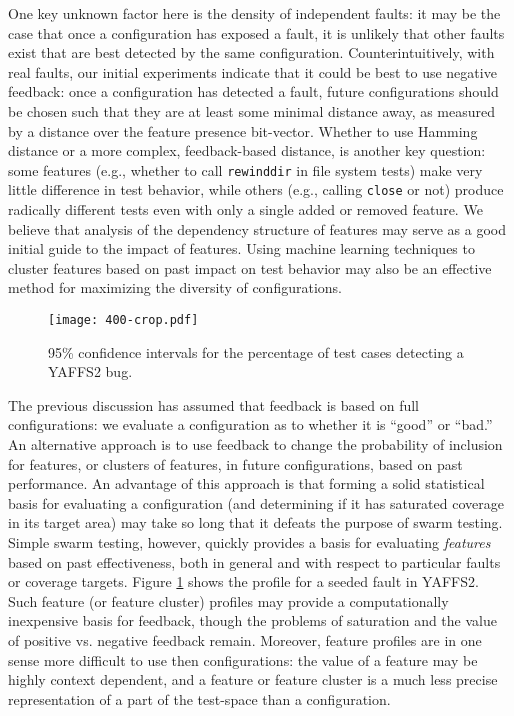 One key unknown factor here is the density of independent faults: it
may be the case that once a configuration has exposed a fault, it is
unlikely that other faults exist that are best detected by the same
configuration.  Counterintuitively, with real faults, our initial
experiments indicate that it could be best to use negative feedback:
once a configuration has detected a fault, future configurations
should be chosen such that they are at least some minimal distance
away, as measured by a distance over the feature presence bit-vector.
Whether to use Hamming distance or a more complex, feedback-based
distance, is another key question: some features (e.g., whether to
call {\tt rewinddir} in file system tests) make very little difference
in test behavior, while others (e.g., calling {\tt close} or not)
produce radically different tests even with only a single added or
removed feature.  We believe that analysis of the dependency structure
of features may serve as a good initial guide to the impact of
features.  Using machine learning techniques to cluster features based
on past impact on test behavior may also be an effective method for
maximizing the diversity of configurations.

\begin{figure}
\centering
\ifpdf%
\texttt{[image: 400-crop.pdf]}
\fi
\caption{95\% confidence intervals for the percentage of test cases 
detecting a YAFFS2 bug.}
\label{fig:confyaffs400}
\end{figure}

The previous discussion has assumed that feedback is based on full
configurations: we evaluate a configuration as to whether it is
``good'' or ``bad.''  An alternative approach is to use feedback to
change the probability of inclusion for features, or clusters of
features, in future configurations, based on past performance.  An
advantage of this approach is that forming a solid statistical basis
for evaluating a configuration (and determining if it has saturated
coverage in its target area) may take so long that it defeats the
purpose of swarm testing.  Simple swarm testing, however, quickly
provides a basis for evaluating \emph{features} based on past
effectiveness, both in general and with respect to particular faults or
coverage targets.  Figure \ref{fig:confyaffs400} shows the profile for
a seeded fault in YAFFS2.  Such feature (or feature cluster) profiles
may provide a computationally inexpensive basis for feedback, though
the problems of saturation and the value of positive vs. negative
feedback remain.  Moreover, feature profiles are in one sense more
difficult to use then configurations: the value of a feature may be
highly context dependent, and a feature or feature cluster is a much
less precise representation of a part of the test-space than a
configuration.

